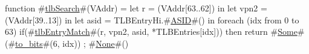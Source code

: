 function #\hyperref[sailMIPSztlbSearch]{tlbSearch}#(VAddr) =
  let r    = (VAddr[63..62]) in
  let vpn2 = (VAddr[39..13]) in
  let asid = TLBEntryHi.#\hyperref[sailMIPSzASID]{ASID}#() in {
    foreach (idx from 0 to 63) {
      if(#\hyperref[sailMIPSztlbEntryMatch]{tlbEntryMatch}#(r, vpn2, asid, *TLBEntries[idx])) then
	return #\hyperref[sailMIPSzSome]{Some}#(#\hyperref[sailMIPSztozybits]{to\_bits}#(6, idx))
    };
    #\hyperref[sailMIPSzNone]{None}#()
  }
